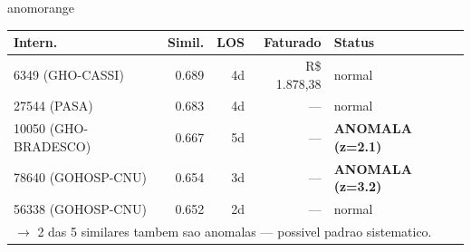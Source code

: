\documentclass[a4paper,10pt]{article}
\begin{document}
\begin{anomalycard}[Internacao 164838 | GHO-PETROBRAS | ALTO (z=3.60)]{anomorange}
\begin{tabular}{l r r r l}\toprule\textbf{Intern.} & \textbf{Simil.} & \textbf{LOS} & \textbf{Faturado} & \textbf{Status} \\\midrule
6349 (GHO-CASSI) & 0.689 & 4d & R\$ 1.878,38 & \textcolor{jcubeblue}{normal} \\
27544 (PASA) & 0.683 & 4d & --- & \textcolor{jcubeblue}{normal} \\
10050 (GHO-BRADESCO) & 0.667 & 5d & --- & \textcolor{anomred}{\textbf{ANOMALA (z=2.1)}} \\
78640 (GOHOSP-CNU) & 0.654 & 3d & --- & \textcolor{anomred}{\textbf{ANOMALA (z=3.2)}} \\
56338 (GOHOSP-CNU) & 0.652 & 2d & --- & \textcolor{jcubeblue}{normal} \\
\multicolumn{5}{l}{\textcolor{anomred}{\small $\rightarrow$ 2 das 5 similares tambem sao anomalas --- possivel padrao sistematico.}} \\
\bottomrule\end{tabular}



\end{anomalycard}

\newpage
\end{document}
